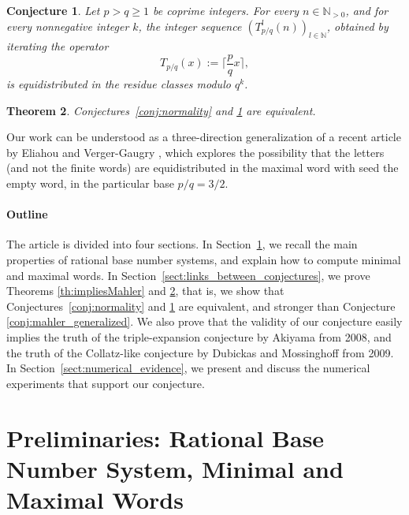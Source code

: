 \documentclass{template_arxiv}
\newtheorem{theorem}{Theorem}[section]
\newtheorem{conjecture}[theorem]{Conjecture}
\numberwithin{equation}{section}
\newcommand{\N}{\mathbb N}
\begin{document}
\begin{conjecture}\label{conj:equidistribution} Let $p > q \geq 1$ be coprime integers. For every $n \in \N_{>0}$, and for every nonnegative integer $k$, the integer sequence $(T_{p/q}^l(n))_{l \in \N}$, obtained by iterating the operator 
\[ T_{p/q}(x) := \Big\lceil \frac{p}{q}x\Big\rceil,\]
is equidistributed in the residue classes modulo $q^k$. \end{conjecture}



\begin{theorem}\label{th:conj_equivalence}
Conjectures~\ref{conj:normality} and \ref{conj:equidistribution} are equivalent.
\end{theorem}

\medskip

Our work can be understood as a three-direction generalization of a recent article by Eliahou and Verger-Gaugry \cite{EVG25}, which explores the possibility that the letters (and not the finite words) are equidistributed in the maximal word with seed the empty word, in the particular base $p/q=3/2$.


\paragraph{Outline} The article is divided into four sections. In Section~\ref{sect:def_and_construction_minimal words}, we recall the main properties of rational base number systems, and explain how to compute minimal and maximal words. In Section~\ref{sect:links_between_conjectures}, we prove Theorems \ref{th:impliesMahler} and \ref{th:conj_equivalence}, that is, we show that Conjectures~\ref{conj:normality} and \ref{conj:equidistribution} are equivalent, and stronger than Conjecture \ref{conj:mahler_generalized}. We also prove that the validity of our conjecture easily implies the truth of the triple-expansion conjecture by Akiyama from 2008, and the truth of the Collatz-like conjecture by Dubickas and Mossinghoff from 2009. In Section~\ref{sect:numerical_evidence}, we present and discuss the numerical experiments that support our conjecture.



\section{Preliminaries: Rational Base Number System, Minimal and Maximal Words}\label{sect:def_and_construction_minimal words}
\end{document}
